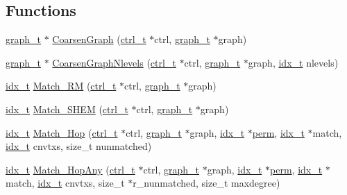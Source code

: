 \subsection*{Functions}
\begin{DoxyCompactItemize}
\item 
\hyperlink{a00734}{graph\+\_\+t} $\ast$ \hyperlink{a00182_adeb2c7c9bffbeca00fcc97854fb88ada}{Coarsen\+Graph} (\hyperlink{a00742}{ctrl\+\_\+t} $\ast$ctrl, \hyperlink{a00734}{graph\+\_\+t} $\ast$graph)
\item 
\hyperlink{a00734}{graph\+\_\+t} $\ast$ \hyperlink{a00182_afa83320e3b311e0feef90d0bf4303716}{Coarsen\+Graph\+Nlevels} (\hyperlink{a00742}{ctrl\+\_\+t} $\ast$ctrl, \hyperlink{a00734}{graph\+\_\+t} $\ast$graph, \hyperlink{a00876_aaa5262be3e700770163401acb0150f52}{idx\+\_\+t} nlevels)
\item 
\hyperlink{a00876_aaa5262be3e700770163401acb0150f52}{idx\+\_\+t} \hyperlink{a00182_a892d2ea16d613abc2276ad5fc6999724}{Match\+\_\+\+RM} (\hyperlink{a00742}{ctrl\+\_\+t} $\ast$ctrl, \hyperlink{a00734}{graph\+\_\+t} $\ast$graph)
\item 
\hyperlink{a00876_aaa5262be3e700770163401acb0150f52}{idx\+\_\+t} \hyperlink{a00182_af3ec72f3170ccdca06d8ad018d86cc58}{Match\+\_\+\+S\+H\+EM} (\hyperlink{a00742}{ctrl\+\_\+t} $\ast$ctrl, \hyperlink{a00734}{graph\+\_\+t} $\ast$graph)
\item 
\hyperlink{a00876_aaa5262be3e700770163401acb0150f52}{idx\+\_\+t} \hyperlink{a00182_aead846b2c69509c914426ff087509934}{Match\+\_\+Hop} (\hyperlink{a00742}{ctrl\+\_\+t} $\ast$ctrl, \hyperlink{a00734}{graph\+\_\+t} $\ast$graph, \hyperlink{a00876_aaa5262be3e700770163401acb0150f52}{idx\+\_\+t} $\ast$\hyperlink{a00879_ab96e9eb84fc7c342d17690a1341645dd}{perm}, \hyperlink{a00876_aaa5262be3e700770163401acb0150f52}{idx\+\_\+t} $\ast$match, \hyperlink{a00876_aaa5262be3e700770163401acb0150f52}{idx\+\_\+t} cnvtxs, size\+\_\+t nunmatched)
\item 
\hyperlink{a00876_aaa5262be3e700770163401acb0150f52}{idx\+\_\+t} \hyperlink{a00182_a838a4013e3b5cc5278ecc7a8757ce0ef}{Match\+\_\+Hop\+Any} (\hyperlink{a00742}{ctrl\+\_\+t} $\ast$ctrl, \hyperlink{a00734}{graph\+\_\+t} $\ast$graph, \hyperlink{a00876_aaa5262be3e700770163401acb0150f52}{idx\+\_\+t} $\ast$\hyperlink{a00879_ab96e9eb84fc7c342d17690a1341645dd}{perm}, \hyperlink{a00876_aaa5262be3e700770163401acb0150f52}{idx\+\_\+t} $\ast$match, \hyperlink{a00876_aaa5262be3e700770163401acb0150f52}{idx\+\_\+t} cnvtxs, size\+\_\+t $\ast$r\+\_\+nunmatched, size\+\_\+t maxdegree)
\item 

\end{DoxyCompactItemize}
